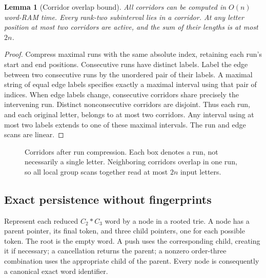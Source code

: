 \documentclass[11pt]{article}
\newtheorem{lemma}[theorem]{Lemma}
\theoremstyle{definition}
\theoremstyle{remark}
\begin{document}
\begin{lemma}[Corridor overlap bound]\label{lem:corridors}
All corridors can be computed in $O(n)$ word-RAM time. Every rank-two
subinterval lies in a corridor. At any letter position at most two corridors
are active, and the sum of their lengths is at most $2n$.
\end{lemma}
\begin{proof}
Compress maximal runs with the same absolute index, retaining each run's
start and end positions. Consecutive runs have distinct labels. Label the
edge between two consecutive runs by the unordered pair of their labels.
A maximal string of equal edge labels specifies exactly a maximal interval
using that pair of indices. When edge labels change, consecutive corridors
share precisely the intervening run. Distinct nonconsecutive corridors are
disjoint. Thus each run, and each original letter, belongs to at most two
corridors. Any interval using at most two labels extends to one of these
maximal intervals. The run and edge scans are linear.
\end{proof}

\begin{figure}[ht]
\centering
{}
\caption{Corridors after run compression. Each box denotes a run, not
necessarily a single letter. Neighboring corridors overlap in one run, so
all local group scans together read at most $2n$ input letters.}
\label{fig:corridors}
\end{figure}

\subsection{Exact persistence without fingerprints}
Represent each reduced $C_2*C_3$ word by a node in a rooted trie. A node has a
parent pointer, its final token, and three child pointers, one for each
possible token. The root is the empty word. A push uses the corresponding
child, creating it if necessary; a cancellation returns the parent; a
nonzero order-three combination uses the appropriate child of the parent.
Every node is consequently a canonical exact word identifier.
\end{document}
